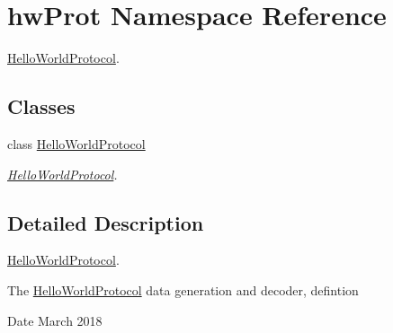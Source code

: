 \hypertarget{namespacehwProt}{}\section{hw\+Prot Namespace Reference}
\label{namespacehwProt}


\mbox{\hyperlink{classhwProt_1_1HelloWorldProtocol}{Hello\+World\+Protocol}}.  


\subsection*{Classes}
\begin{DoxyCompactItemize}
\item 
class \mbox{\hyperlink{classhwProt_1_1HelloWorldProtocol}{Hello\+World\+Protocol}}
\begin{DoxyCompactList}\small\item\em \mbox{\hyperlink{classhwProt_1_1HelloWorldProtocol}{Hello\+World\+Protocol}}. \end{DoxyCompactList}\end{DoxyCompactItemize}


\subsection{Detailed Description}
\mbox{\hyperlink{classhwProt_1_1HelloWorldProtocol}{Hello\+World\+Protocol}}. 

The \mbox{\hyperlink{classhwProt_1_1HelloWorldProtocol}{Hello\+World\+Protocol}} data generation and decoder, defintion

\begin{DoxyDate}{Date}
March 2018 
\end{DoxyDate}
